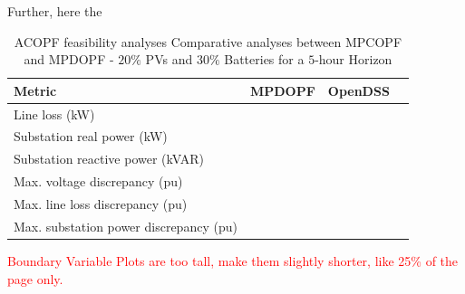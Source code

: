 \documentclass[../../outputs/main.tex]{subfiles}
\begin{document}
Further, here the 

\begin{table}[h!]
    \centering
    \caption{ACOPF feasibility analyses Comparative analyses between MPCOPF and MPDOPF - $20 \%$ PVs and $30 \%$ Batteries for a $5$-hour Horizon}
    \begin{tabular}{|l|c|c|c|}
    \hline
    \textbf{Metric} & \textbf{MPDOPF} & \textbf{OpenDSS} \\ \hline
    Line loss (kW) &   &  \\ \hline
    Substation real power (kW) &    &   \\ \hline
    Substation reactive power (kVAR) &    &   \\ \hline
    Max. voltage discrepancy (pu) &    &    \\ \hline
    Max. line loss discrepancy (pu) &    &   \\ \hline
    Max. substation power discrepancy (pu) &     &   \\ \hline
    \end{tabular}
    \label{table:feas-5-}
\end{table}


\textcolor{red}{Boundary Variable Plots are too tall, make them slightly shorter, like 25\% of the page only.}

    
\end{document}
